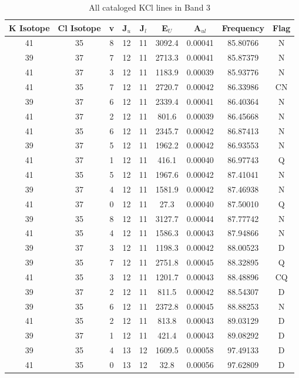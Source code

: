 \begin{table*}[htp]
\centering
\caption{All cataloged KCl lines in Band 3}
\begin{tabular}{ccccccccc}
\label{tab:K_detections_B3}
K Isotope & Cl Isotope & v & J$_u$ & J$_l$ & E$_U$ & A$_{ul}$ & Frequency & Flag \\
\hline
41 & 35 & 8 & 12 & 11 & 3092.4 & 0.00041 & 85.80766 & N \\
39 & 37 & 7 & 12 & 11 & 2713.3 & 0.00041 & 85.87379 & N \\
41 & 37 & 3 & 12 & 11 & 1183.9 & 0.00039 & 85.93776 & N \\
41 & 35 & 7 & 12 & 11 & 2720.7 & 0.00042 & 86.33986 & CN \\
39 & 37 & 6 & 12 & 11 & 2339.4 & 0.00041 & 86.40364 & N \\
41 & 37 & 2 & 12 & 11 & 801.6 & 0.00039 & 86.45668 & N \\
41 & 35 & 6 & 12 & 11 & 2345.7 & 0.00042 & 86.87413 & N \\
39 & 37 & 5 & 12 & 11 & 1962.2 & 0.00042 & 86.93553 & N \\
41 & 37 & 1 & 12 & 11 & 416.1 & 0.00040 & 86.97743 & Q \\
41 & 35 & 5 & 12 & 11 & 1967.6 & 0.00042 & 87.41041 & N \\
39 & 37 & 4 & 12 & 11 & 1581.9 & 0.00042 & 87.46938 & N \\
41 & 37 & 0 & 12 & 11 & 27.3 & 0.00040 & 87.50010 & Q \\
39 & 35 & 8 & 12 & 11 & 3127.7 & 0.00044 & 87.77742 & N \\
41 & 35 & 4 & 12 & 11 & 1586.3 & 0.00043 & 87.94866 & N \\
39 & 37 & 3 & 12 & 11 & 1198.3 & 0.00042 & 88.00523 & D \\
39 & 35 & 7 & 12 & 11 & 2751.8 & 0.00045 & 88.32895 & Q \\
41 & 35 & 3 & 12 & 11 & 1201.7 & 0.00043 & 88.48896 & CQ \\
39 & 37 & 2 & 12 & 11 & 811.5 & 0.00042 & 88.54307 & D \\
39 & 35 & 6 & 12 & 11 & 2372.8 & 0.00045 & 88.88253 & N \\
41 & 35 & 2 & 12 & 11 & 813.8 & 0.00043 & 89.03129 & D \\
39 & 37 & 1 & 12 & 11 & 421.4 & 0.00043 & 89.08292 & D \\
39 & 35 & 4 & 13 & 12 & 1609.5 & 0.00058 & 97.49133 & D \\
41 & 35 & 0 & 13 & 12 & 32.8 & 0.00056 & 97.62809 & D \\

\end{tabular}
\end{table*}
